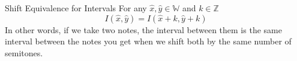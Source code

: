 \begin{proposition}{Shift Equivalence for Intervals}
  For any $ \widehat{x}, \widehat{y} \in \mathbb{W}$ and $k \in \mathbb{Z}$ 
  \[
  I\left( \widehat{x}, \widehat{y}\right) = I\left( \widehat{x}  +  k, \widehat{y}  +  k\right)
  \]
  In other words, if we take two notes, the interval between them is the same interval between the notes you get when we shift both by the same number of semitones.
\end{proposition}




